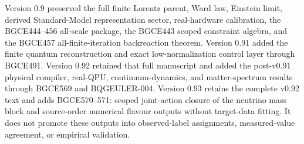 \documentclass[11pt]{article}
\theoremstyle{definition}
\theoremstyle{remark}
\begin{document}
Version 0.9 preserved the full finite Lorentz parent, Ward law, Einstein limit, derived Standard-Model representation sector, real-hardware calibration, the BGCE444--456 all-scale package, the BGCE443 scoped constraint algebra, and the BGCE457 all-finite-iteration backreaction theorem. Version 0.91 added the finite quantum reconstruction and exact low-normalization control layer through BGCE491. Version 0.92 retained that full manuscript and added the post-v0.91 physical compiler, real-QPU, continuum-dynamics, and matter-spectrum results through BGCE569 and BQGEULER-004. Version 0.93 retains the complete v0.92 text and adds BGCE570--571: scoped joint-action closure of the neutrino mass block and source-order numerical flavour outputs without target-data fitting. It does not promote these outputs into observed-label assignments, measured-value agreement, or empirical validation.
\end{document}
